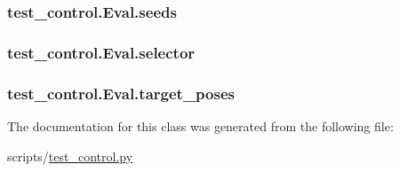 \subsubsection[{\texorpdfstring{seeds}{seeds}}]{\setlength{\rightskip}{0pt plus 5cm}test\+\_\+control.\+Eval.\+seeds}\hypertarget{classtest__control_1_1_eval_a8a5bcba911170d8f1863f18e9c70753b}{}\label{classtest__control_1_1_eval_a8a5bcba911170d8f1863f18e9c70753b}
\subsubsection[{\texorpdfstring{selector}{selector}}]{\setlength{\rightskip}{0pt plus 5cm}test\+\_\+control.\+Eval.\+selector}\hypertarget{classtest__control_1_1_eval_a45b2a98522b490446543404b549772a5}{}\label{classtest__control_1_1_eval_a45b2a98522b490446543404b549772a5}
\subsubsection[{\texorpdfstring{target\+\_\+poses}{target_poses}}]{\setlength{\rightskip}{0pt plus 5cm}test\+\_\+control.\+Eval.\+target\+\_\+poses}\hypertarget{classtest__control_1_1_eval_a607d2a335587c88ed5501a7496f28c0a}{}\label{classtest__control_1_1_eval_a607d2a335587c88ed5501a7496f28c0a}


The documentation for this class was generated from the following file\+:\begin{DoxyCompactItemize}
\item 
scripts/\hyperlink{test__control_8py}{test\+\_\+control.\+py}\end{DoxyCompactItemize}
